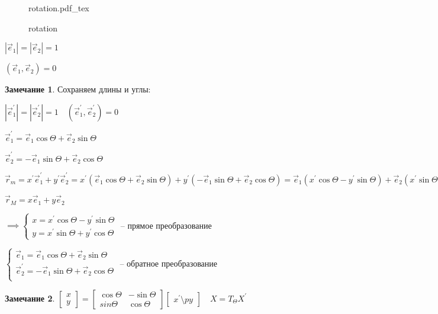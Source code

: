 \documentclass{book}
\newcommand{\p}[1]{#1^{\prime}}
\theoremstyle{definition}
\newtheorem*{note}{Замечание}
\newcommand{\incfig}[1]{%
    \def\svgwidth{\columnwidth}
    {#1.pdf_tex}
}
\begin{document}
\begin{figure}[ht]
    \centering
    \incfig{rotation}
    \caption{rotation}
    \label{fig:rotation}
\end{figure}

$\left| \vec e_1 \right|  = \left| \vec e_2 \right| = 1$

$\left( \vec e_1, \vec e_2 \right) =0$

\begin{note}
    Сохраняем длины и углы:

    $\left| \p {\vec e_1} \right| = \left| \p{\vec e_2} \right| =1\quad (\p{\vec e_1}, \p{\vec e_2}) = 0$

    $\p{\vec e_1} = \vec e_1\cos \Theta + \vec e_2\sin \Theta$

    $\p{\vec e_2} = -\vec e_1\sin \Theta + \vec e_2\cos \Theta$
\end{note}

$\vec r_m = \p x\p{\vec e_1} + \p y\p{\vec e_2} = \p x(\vec e_1\cos \Theta + \vec e_2\sin \Theta) + \p y(-\vec e_1\sin \Theta + \vec e_2\cos \Theta) = \vec e_1\left( \p x\cos \Theta - \p y\sin \Theta \right)  + \vec e_2\left( \p x\sin \Theta + \p y\cos \Theta \right) $

$\vec r_M = x\vec e_1 + y\vec e_2$

$\implies \begin{cases}
    x = \p x\cos\Theta - \p y\sin \Theta\\
    y = \p x\sin \Theta + \p y\cos \Theta
\end{cases}$ -- прямое преобразование
    
$\begin{cases}
    {\vec e_1} = \vec e_1\cos \Theta + \vec e_2\sin \Theta\\
    \p{\vec e_2} = -\vec e_1\sin \Theta + \vec e_2\cos \Theta\\
\end{cases}$ -- обратное преобразование

\begin{note}
    $\begin{bmatrix} x\\y \end{bmatrix} = \begin{bmatrix} \cos \Theta&-\sin \Theta\\sin\Theta & \cos \Theta \end{bmatrix} \begin{bmatrix} \p x\setminus p y \end{bmatrix} \quad X = T_{\Theta}\p X$
\end{note}
\end{document}
